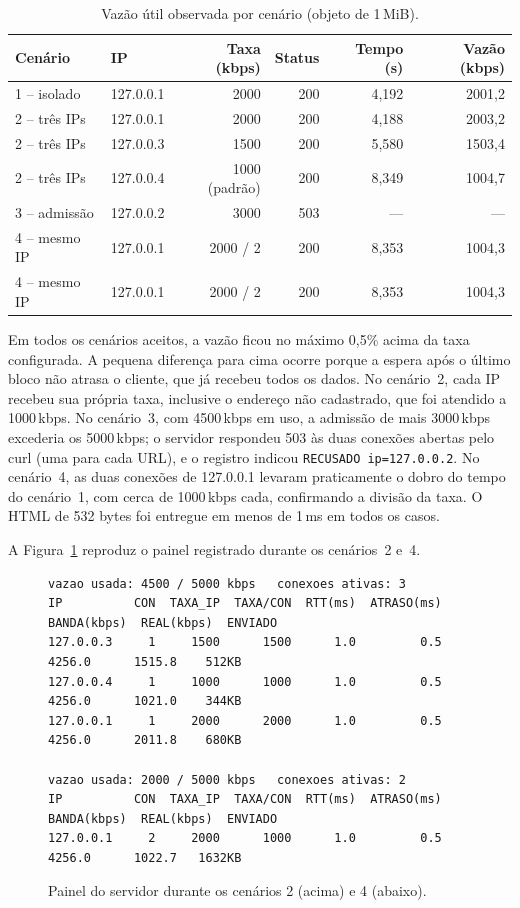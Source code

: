 \documentclass[12pt,a4paper]{article}
\begin{document}
\begin{table}[h]
\centering
\caption{Vazão útil observada por cenário (objeto de 1\,MiB).}
\label{tab:res}
\small
\begin{tabular}{@{}llrrrr@{}}
\toprule
\textbf{Cenário} & \textbf{IP} & \textbf{Taxa (kbps)} & \textbf{Status} & \textbf{Tempo (s)} & \textbf{Vazão (kbps)} \\
\midrule
1 -- isolado      & 127.0.0.1 & 2000 & 200 & 4,192 & 2001,2 \\
2 -- três IPs     & 127.0.0.1 & 2000 & 200 & 4,188 & 2003,2 \\
2 -- três IPs     & 127.0.0.3 & 1500 & 200 & 5,580 & 1503,4 \\
2 -- três IPs     & 127.0.0.4 & 1000 (padrão) & 200 & 8,349 & 1004,7 \\
3 -- admissão     & 127.0.0.2 & 3000 & 503 & --- & --- \\
4 -- mesmo IP     & 127.0.0.1 & 2000 / 2 & 200 & 8,353 & 1004,3 \\
4 -- mesmo IP     & 127.0.0.1 & 2000 / 2 & 200 & 8,353 & 1004,3 \\
\bottomrule
\end{tabular}
\end{table}

Em todos os cenários aceitos, a vazão ficou no máximo 0,5\% acima da taxa configurada.
A pequena diferença para cima ocorre porque a espera após o último bloco não atrasa o
cliente, que já recebeu todos os dados.
No cenário~2, cada IP recebeu sua própria taxa, inclusive o endereço não cadastrado, que
foi atendido a 1000\,kbps. No cenário~3, com 4500\,kbps em uso, a admissão de mais
3000\,kbps excederia os 5000\,kbps; o servidor respondeu 503 às duas conexões abertas pelo
curl (uma para cada URL), e o registro indicou \texttt{RECUSADO ip=127.0.0.2}. No
cenário~4, as duas conexões de 127.0.0.1 levaram praticamente o dobro do tempo do
cenário~1, com cerca de 1000\,kbps cada, confirmando a divisão da taxa. O HTML de 532 bytes
foi entregue em menos de 1\,ms em todos os casos.

A Figura~\ref{fig:painel} reproduz o painel registrado durante os cenários~2 e~4.

\begin{figure}[h]
\centering
\scriptsize
\begin{verbatim}
vazao usada: 4500 / 5000 kbps   conexoes ativas: 3
IP          CON  TAXA_IP  TAXA/CON  RTT(ms)  ATRASO(ms)  BANDA(kbps)  REAL(kbps)  ENVIADO
127.0.0.3     1     1500      1500      1.0         0.5       4256.0      1515.8    512KB
127.0.0.4     1     1000      1000      1.0         0.5       4256.0      1021.0    344KB
127.0.0.1     1     2000      2000      1.0         0.5       4256.0      2011.8    680KB

vazao usada: 2000 / 5000 kbps   conexoes ativas: 2
IP          CON  TAXA_IP  TAXA/CON  RTT(ms)  ATRASO(ms)  BANDA(kbps)  REAL(kbps)  ENVIADO
127.0.0.1     2     2000      1000      1.0         0.5       4256.0      1022.7   1632KB
\end{verbatim}
\caption{Painel do servidor durante os cenários 2 (acima) e 4 (abaixo).}
\label{fig:painel}
\end{figure}
\end{document}
